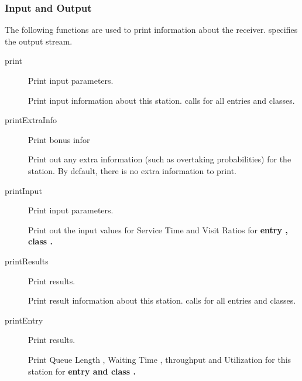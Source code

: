 \subsubsection{Input and Output}
\label{sec:server-print}

The following functions are used to print information about the
receiver.   specifies the output stream.

\begin{description}
\item[print] \texonly{---} Print input parameters.\\

  Print input information about this station.   calls
   for all entries and classes.

\item[printExtraInfo] \texonly{---} Print bonus infor\\

  Print out any extra information (such as overtaking probabilities) for
  the station.  By default, there is no extra information to print.

\item[printInput] \texonly{---} Print input parameters.\\

  Print out the input values for Service Time
   and Visit Ratios
   for \bf{entry} ,
  \bf{class} . 

\item[printResults] \texonly{---} Print results.\\

  Print result information about this station.   calls
   for all entries and classes.

\item[printEntry] \texonly{---} Print results.\\

  Print Queue Length , Waiting Time
  , throughput and Utilization
   for this station for \bf{entry}
   and \bf{class} .
\end{description}


